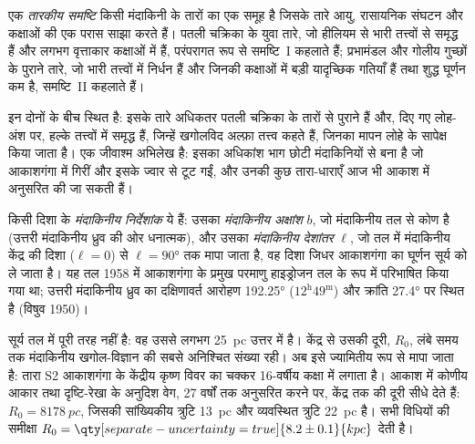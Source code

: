 \begin{definition}[तारकीय समष्टि]\label{def:b3:milky-way-galaxies:populations}
एक \emph{तारकीय समष्टि} किसी मंदाकिनी के तारों का एक समूह है
जिसके तारे आयु, रासायनिक संघटन और कक्षाओं की एक परास साझा करते हैं।
पतली चक्रिका के युवा तारे, जो हीलियम से भारी तत्त्वों से समृद्ध हैं
और लगभग वृत्ताकार कक्षाओं में हैं, परंपरागत रूप से समष्टि~I कहलाते हैं;
प्रभामंडल और गोलीय गुच्छों के पुराने तारे, जो
भारी तत्त्वों में निर्धन हैं और जिनकी कक्षाओं में बड़ी यादृच्छिक गतियाँ हैं तथा शुद्ध घूर्णन कम है,
समष्टि~II कहलाते हैं।
\end{definition}

 इन दोनों के बीच स्थित है: इसके तारे अधिकतर
पतली चक्रिका के तारों से पुराने हैं और, दिए गए लोह-अंश पर, हल्के तत्त्वों में समृद्ध हैं,
जिन्हें खगोलविद अल्फ़ा तत्त्व कहते हैं, जिनका मापन लोहे के सापेक्ष किया जाता है।
 एक
जीवाश्म अभिलेख है: इसका अधिकांश भाग छोटी मंदाकिनियों से बना है जो
आकाशगंगा में गिरीं और इसके ज्वार से टूट गईं, और उनकी कुछ तारा-धाराएँ
आज भी आकाश में अनुसरित की जा सकती हैं।

\begin{definition}[मंदाकिनीय निर्देशांक]\label{def:b3:milky-way-galaxies:coordinates}
किसी दिशा के \emph{मंदाकिनीय निर्देशांक} ये हैं:
उसका \emph{मंदाकिनीय अक्षांश} $b$, जो मंदाकिनीय तल से कोण है
(उत्तरी मंदाकिनीय ध्रुव की ओर धनात्मक), और उसका \emph{मंदाकिनीय
देशांतर} $\ell$, जो तल में मंदाकिनीय केंद्र की दिशा ($\ell = 0$) से
$\ell = \ang{90}$ तक मापा जाता है, वह दिशा जिधर
आकाशगंगा का घूर्णन सूर्य को ले जाता है। यह तल
1958 में आकाशगंगा के प्रमुख परमाणु हाइड्रोजन तल के रूप में परिभाषित किया गया था;
उत्तरी मंदाकिनीय ध्रुव का दक्षिणावर्त आरोहण \ang{192.25}
($12^\mathrm{h}49^\mathrm{m}$) और क्रांति \ang{27.4} पर स्थित है
(विषुव 1950)।
\end{definition}

सूर्य तल में पूरी तरह नहीं है: वह उससे लगभग \qty{25}{pc} उत्तर में है।
केंद्र से उसकी दूरी, $R_0$, लंबे समय तक मंदाकिनीय खगोल-विज्ञान की
सबसे अनिश्चित संख्या रही। अब इसे ज्यामितीय रूप से मापा जाता है: तारा S2
आकाशगंगा के केंद्रीय कृष्ण विवर का चक्कर \num{16}-वर्षीय कक्षा में लगाता है।
आकाश में कोणीय आकार तथा दृष्टि-रेखा के अनुदिश वेग,
27 वर्षों तक अनुसरित करने पर, केंद्र तक की दूरी सीधे देते हैं:
$R_0 = \qty{8178}{pc}$, जिसकी सांख्यिकीय त्रुटि \qty{13}{pc} और व्यवस्थित
त्रुटि \qty{22}{pc} है। सभी विधियों की समीक्षा
$R_0 = \qty[separate-uncertainty=true]{8.2 \pm 0.1}{kpc}$ देती है।

